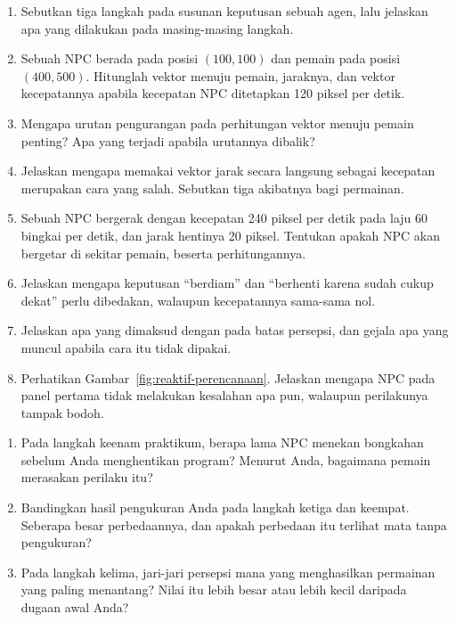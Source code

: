 
\begin{enumerate}
  \item Sebutkan tiga langkah pada susunan keputusan sebuah agen, lalu
        jelaskan apa yang dilakukan pada masing-masing langkah.

  \item Sebuah NPC berada pada posisi $(100, 100)$ dan pemain pada posisi
        $(400, 500)$. Hitunglah vektor menuju pemain, jaraknya, dan vektor
        kecepatannya apabila kecepatan NPC ditetapkan 120 piksel per detik.

  \item Mengapa urutan pengurangan pada perhitungan vektor menuju pemain
        penting? Apa yang terjadi apabila urutannya dibalik?

  \item Jelaskan mengapa memakai vektor jarak secara langsung sebagai kecepatan
        merupakan cara yang salah. Sebutkan tiga akibatnya bagi permainan.

  \item Sebuah NPC bergerak dengan kecepatan 240 piksel per detik pada laju 60
        bingkai per detik, dan jarak hentinya 20 piksel. Tentukan apakah NPC
        akan bergetar di sekitar pemain, beserta perhitungannya.

  \item Jelaskan mengapa keputusan ``berdiam'' dan ``berhenti karena sudah
        cukup dekat'' perlu dibedakan, walaupun kecepatannya sama-sama nol.

  \item Jelaskan apa yang dimaksud dengan  pada batas
        persepsi, dan gejala apa yang muncul apabila cara itu tidak dipakai.

  \item Perhatikan Gambar~\ref{fig:reaktif-perencanaan}. Jelaskan mengapa NPC
        pada panel pertama tidak melakukan kesalahan apa pun, walaupun
        perilakunya tampak bodoh.
\end{enumerate}

\begin{refleksibox}
\begin{enumerate}
  \item Pada langkah keenam praktikum, berapa lama NPC menekan bongkahan sebelum
        Anda menghentikan program? Menurut Anda, bagaimana pemain merasakan
        perilaku itu?
  \item Bandingkan hasil pengukuran Anda pada langkah ketiga dan keempat.
        Seberapa besar perbedaannya, dan apakah perbedaan itu terlihat mata
        tanpa pengukuran?
  \item Pada langkah kelima, jari-jari persepsi mana yang menghasilkan
        permainan yang paling menantang? Nilai itu lebih besar atau lebih kecil
        daripada dugaan awal Anda?
\end{enumerate}
\end{refleksibox}
